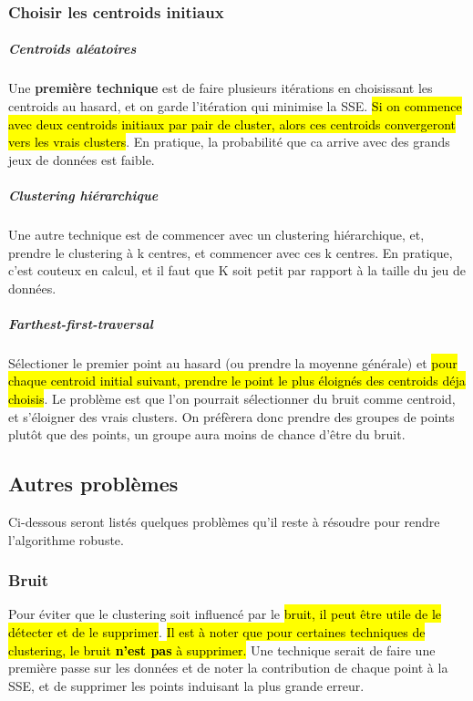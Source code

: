 \documentclass[letterpaper, 12pt]{article}
\newcommand{\alinea}{
\hspace*{0.5cm}}
\begin{document}
			\subsubsection{Choisir les centroids initiaux}
				\subparagraph{Centroids aléatoires}	
					Une \textbf{première technique} est de
					faire plusieurs itérations en choisissant
					les centroids au hasard, et on garde l'itération
					qui minimise la SSE. \hl{Si on commence avec deux
					centroids initiaux par pair de cluster, alors
					ces centroids convergeront vers les vrais clusters}.
					En pratique, la probabilité que ca arrive avec des grands
					jeux de données est faible.
				\subparagraph{Clustering hiérarchique} Une autre technique
					est de commencer avec un clustering hiérarchique,
					et, prendre le clustering à k centres, et commencer avec
					ces k centres. En pratique, c'est couteux en calcul,
					et il faut que K soit petit par rapport à la taille
					du jeu de données.
				\subparagraph{Farthest-first-traversal} Sélectioner
					le premier point au hasard (ou prendre la moyenne 
					générale) et \hl{pour chaque centroid initial suivant,
					prendre le point le plus éloignés des centroids déja
					choisis}. Le problème est que l'on pourrait sélectionner
					du bruit comme centroid, et s'éloigner des vrais clusters.
					On préfèrera donc prendre des groupes de points plutôt
					que des points, un groupe aura moins de chance d'être du
					bruit.
		\subsection{Autres problèmes}
			\alinea Ci-dessous seront listés quelques problèmes qu'il reste
				à résoudre pour rendre l'algorithme robuste.
			\subsubsection{Bruit}
				\alinea Pour éviter que le clustering soit influencé
					par le \hl{bruit, il peut être utile de le détecter et
					de le supprimer}. \hl{Il est à noter que pour certaines
					techniques de clustering, le bruit \textbf{n'est pas} à 
					supprimer.} Une technique serait de faire une première
					passe sur les données et de noter la contribution
					de chaque point à la SSE, et de supprimer les points
					induisant la plus grande erreur.
\end{document}
